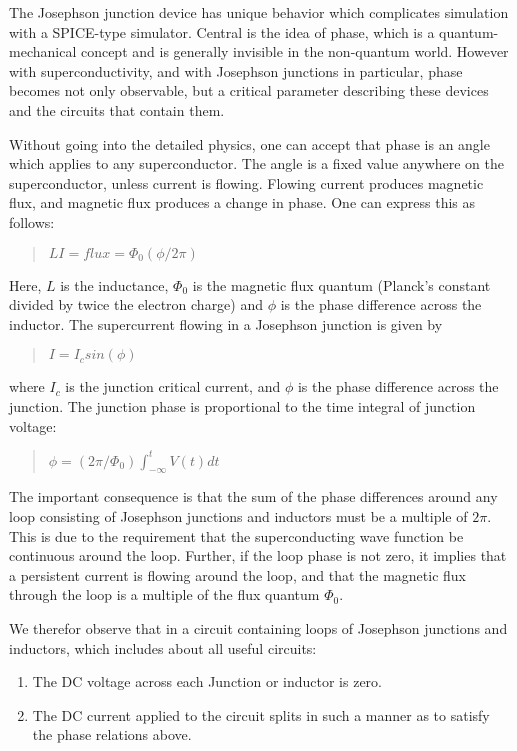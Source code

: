 The Josephson junction device has unique behavior which complicates
simulation with a SPICE-type simulator.  Central is the idea of phase,
which is a quantum-mechanical concept and is generally invisible in
the non-quantum world.  However with superconductivity, and with
Josephson junctions in particular, phase becomes not only observable,
but a critical parameter describing these devices and the circuits
that contain them.

Without going into the detailed physics, one can accept that phase is
an angle which applies to any superconductor.  The angle is a fixed
value anywhere on the superconductor, unless current is flowing. 
Flowing current produces magnetic flux, and magnetic flux produces a
change in phase.  One can express this as follows:

\begin{quote}
$LI = flux = \Phi_0(\phi/2\pi)$
\end{quote}

Here, $L$ is the inductance, $\Phi_0$ is the magnetic flux quantum
(Planck's constant divided by twice the electron charge) and $\phi$ is
the phase difference across the inductor.  The supercurrent flowing in
a Josephson junction is given by

\begin{quote}
$I = I_c sin(\phi)$
\end{quote}

where $I_c$ is the junction critical current, and $\phi$ is the phase
difference across the junction.  The junction phase is proportional to
the time integral of junction voltage:

\begin{quote}
$\phi = (2\pi/\Phi_0)\int^t_{-\infty} V(t)dt$
\end{quote}

The important consequence is that the sum of the phase differences
around any loop consisting of Josephson junctions and inductors must
be a multiple of $2\pi$.  This is due to the requirement that the
superconducting wave function be continuous around the loop.  Further,
if the loop phase is not zero, it implies that a persistent current is
flowing around the loop, and that the magnetic flux through the loop
is a multiple of the flux quantum $\Phi_0$.

We therefor observe that in a circuit containing loops of Josephson
junctions and inductors, which includes about all useful circuits:

\begin{enumerate}
\item{The DC voltage across each Junction or inductor is zero.}
\item{The DC current applied to the circuit splits in such a manner
as to satisfy the phase relations above.}
\end{enumerate}

